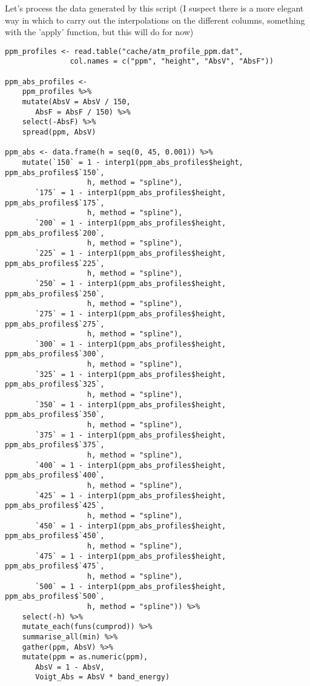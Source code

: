 \documentclass[10pt,a4paper,titlepage]{article}
\begin{document}
Let's process the data generated by this script (I suspect there is a
more elegant way in which to carry out the interpolations on the
different columns, something with the 'apply' function, but this will
do for now)
\begin{lstlisting}
ppm_profiles <- read.table("cache/atm_profile_ppm.dat",
			   col.names = c("ppm", "height", "AbsV", "AbsF"))

ppm_abs_profiles <- 
    ppm_profiles %>%
    mutate(AbsV = AbsV / 150,
	   AbsF = AbsF / 150) %>%
    select(-AbsF) %>%
    spread(ppm, AbsV)

ppm_abs <- data.frame(h = seq(0, 45, 0.001)) %>%
    mutate(`150` = 1 - interp1(ppm_abs_profiles$height, ppm_abs_profiles$`150`,
			       h, method = "spline"),
	   `175` = 1 - interp1(ppm_abs_profiles$height, ppm_abs_profiles$`175`,
			       h, method = "spline"),
	   `200` = 1 - interp1(ppm_abs_profiles$height, ppm_abs_profiles$`200`,
			       h, method = "spline"),
	   `225` = 1 - interp1(ppm_abs_profiles$height, ppm_abs_profiles$`225`,
			       h, method = "spline"),
	   `250` = 1 - interp1(ppm_abs_profiles$height, ppm_abs_profiles$`250`,
			       h, method = "spline"),
	   `275` = 1 - interp1(ppm_abs_profiles$height, ppm_abs_profiles$`275`,
			       h, method = "spline"),
	   `300` = 1 - interp1(ppm_abs_profiles$height, ppm_abs_profiles$`300`,
			       h, method = "spline"),
	   `325` = 1 - interp1(ppm_abs_profiles$height, ppm_abs_profiles$`325`,
			       h, method = "spline"),
	   `350` = 1 - interp1(ppm_abs_profiles$height, ppm_abs_profiles$`350`,
			       h, method = "spline"),
	   `375` = 1 - interp1(ppm_abs_profiles$height, ppm_abs_profiles$`375`,
			       h, method = "spline"),
	   `400` = 1 - interp1(ppm_abs_profiles$height, ppm_abs_profiles$`400`,
			       h, method = "spline"),
	   `425` = 1 - interp1(ppm_abs_profiles$height, ppm_abs_profiles$`425`,
			       h, method = "spline"),
	   `450` = 1 - interp1(ppm_abs_profiles$height, ppm_abs_profiles$`450`,
			       h, method = "spline"),
	   `475` = 1 - interp1(ppm_abs_profiles$height, ppm_abs_profiles$`475`,
			       h, method = "spline"),
	   `500` = 1 - interp1(ppm_abs_profiles$height, ppm_abs_profiles$`500`,
			       h, method = "spline")) %>%
    select(-h) %>%
    mutate_each(funs(cumprod)) %>%
    summarise_all(min) %>%
    gather(ppm, AbsV) %>%
    mutate(ppm = as.numeric(ppm),
	   AbsV = 1 - AbsV,
	   Voigt_Abs = AbsV * band_energy)
\end{lstlisting}
\end{document}
